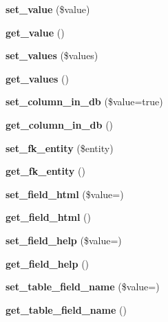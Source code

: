 \begin{DoxyCompactItemize}
\mbox{\label{class_column_a156be29aa2b09b0685b54e4eb273e98f}} 
{\bfseries set\+\_\+value} (\$value)
\item 
\mbox{\label{class_column_a16ae34425bea11e5f6435f2a8987a798}} 
{\bfseries get\+\_\+value} ()
\item 
\mbox{\label{class_column_ae867869393b7a30d7a41490497544c81}} 
{\bfseries set\+\_\+values} (\$values)
\item 
\mbox{\label{class_column_a58db8b06f4c93ec071a51a1f76009052}} 
{\bfseries get\+\_\+values} ()
\item 
\mbox{\label{class_column_af7dbe1ffea3921f6af03c05ca057e7f2}} 
{\bfseries set\+\_\+column\+\_\+in\+\_\+db} (\$value=true)
\item 
\mbox{\label{class_column_ac730ad2d5ffed1e805200bf0cdc15064}} 
{\bfseries get\+\_\+column\+\_\+in\+\_\+db} ()
\item 
\mbox{\label{class_column_ac98ea0f2cf873e1169d470b6b8aed87e}} 
{\bfseries set\+\_\+fk\+\_\+entity} (\$entity)
\item 
\mbox{\label{class_column_ac8077334a5b99bee2ff2d63f211373cc}} 
{\bfseries get\+\_\+fk\+\_\+entity} ()
\item 
\mbox{\label{class_column_a5437315051a5e96842582d3668554245}} 
{\bfseries set\+\_\+field\+\_\+html} (\$value=\textquotesingle{}\textquotesingle{})
\item 
\mbox{\label{class_column_aac0bf1664721d84626a1fc9eca321488}} 
{\bfseries get\+\_\+field\+\_\+html} ()
\item 
\mbox{\label{class_column_ad21200d7ae8693427a38e51c100badf6}} 
{\bfseries set\+\_\+field\+\_\+help} (\$value=\textquotesingle{}\textquotesingle{})
\item 
\mbox{\label{class_column_a1fe455614c5937aec57db013d23df078}} 
{\bfseries get\+\_\+field\+\_\+help} ()
\item 
\mbox{\label{class_column_a314eeaf954a8c2607626f9c742a9f579}} 
{\bfseries set\+\_\+table\+\_\+field\+\_\+name} (\$value=\textquotesingle{}\textquotesingle{})
\item 
\mbox{\label{class_column_a9322fc30623d22ff4023413a43250689}} 
{\bfseries get\+\_\+table\+\_\+field\+\_\+name} ()
\end{DoxyCompactItemize}

